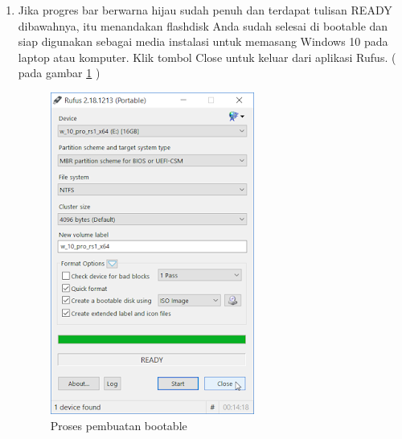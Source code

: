 \begin{enumerate}
  \item Jika progres bar berwarna hijau sudah penuh dan terdapat tulisan READY dibawahnya, itu menandakan flashdisk Anda sudah selesai di bootable dan siap digunakan sebagai media instalasi untuk memasang Windows 10 pada laptop atau komputer. Klik tombol Close untuk keluar dari aplikasi Rufus. ( pada gambar \ref{labelgambar6} )
      \begin{figure}[h!]
	\centering
	\includegraphics[scale=0.4]{figures/6.png}
	\caption{Proses pembuatan bootable}
	\label{labelgambar6}
	\end{figure}
\end{enumerate}

